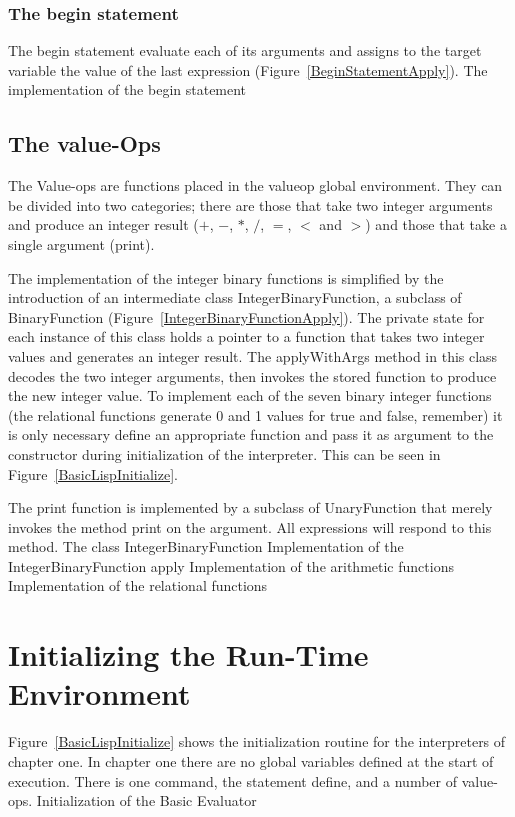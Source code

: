 \subsubsection{The begin statement}

The begin statement evaluate each of its arguments and assigns to the target
variable the value of the last expression (Figure~\ref{BeginStatementApply}).
%
{The implementation of the begin statement}

\subsection{The value-Ops}

The Value-ops are functions placed in the {\sf valueop} global environment.
They can be divided into two categories; there are those that take two integer
arguments and produce an integer result ($+$, $-$, $*$, $/$, $=$, $<$ and $>$)
and those that take a single argument ({\sf print}).

The implementation of the integer binary functions is simplified by the
introduction of an intermediate class {\sf IntegerBinaryFunction}, a subclass of
{\sf BinaryFunction} (Figure~\ref{IntegerBinaryFunctionApply}).  The private
state for each instance of this class holds a pointer to a function that takes
two integer values and generates an integer result.  The {\sf applyWithArgs}
method in this class decodes the two integer arguments, then invokes the stored
function to produce the new integer value.  To implement each of the seven
binary integer functions (the relational functions generate 0 and 1 values for
true and false, remember) it is only necessary define an appropriate function
and pass it as argument to the constructor during initialization of the
interpreter.  This can be seen in Figure~\ref{BasicLispInitialize}.

The print function is implemented by a subclass of {\sf UnaryFunction} that
merely invokes the method {\sf print} on the argument.  All expressions will
respond to this method.
%
{The class {\sf IntegerBinaryFunction}}
%
{Implementation of the {\sf IntegerBinaryFunction} apply}
%
{Implementation of the arithmetic functions}
%
{Implementation of the relational functions}

\section{Initializing the Run-Time Environment}

Figure~\ref{BasicLispInitialize} shows the initialization routine for the
interpreters of chapter one.  In chapter one there are no global variables
defined at the start of execution.  There is one command, the statement {\sf
    define}, and a number of value-ops.
%
{Initialization of the Basic Evaluator}
